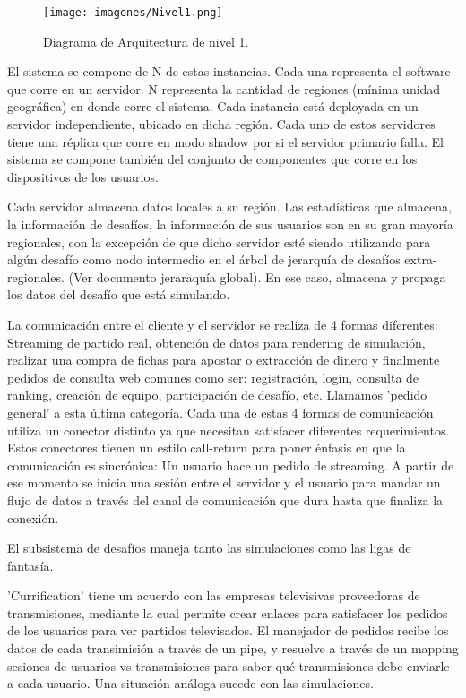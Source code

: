 \begin{figure}[H]
  \centering
  \texttt{[image: imagenes/Nivel1.png]}
  \caption{Diagrama de Arquitectura de nivel 1.}
\end{figure}

El sistema se compone de N de estas instancias. Cada una representa el software que corre en un servidor. N representa la cantidad de regiones (mínima unidad geográfica) en donde corre el sistema. Cada instancia está deployada en un servidor independiente, ubicado en dicha región. Cada uno de estos servidores tiene una réplica que corre en modo shadow por si el servidor primario falla.
El sistema se compone también del conjunto de componentes que corre en los dispositivos de los usuarios.

Cada servidor almacena datos locales a su región. Las estadísticas que almacena, la información de desafíos, la información de sus usuarios son en su gran mayoría regionales, con la excepción
de que dicho servidor esté siendo utilizando para algún desafío como nodo intermedio en el árbol de jerarquía de desafíos extra-regionales. (Ver documento jeraraquía global). En ese caso,
almacena y propaga los datos del desafío que está simulando.

La comunicación entre el cliente y el servidor se realiza de 4 formas diferentes: Streaming de partido real, obtención de datos para rendering de simulación, realizar una compra de fichas
para apostar o extracción de dinero y finalmente pedidos de consulta web comunes como ser: registración, login, consulta de ranking, creación de equipo, participación de desafío, etc. Llamamos
'pedido general' a esta última categoría. Cada una de estas 4 formas de comunicación utiliza un conector distinto ya que necesitan satisfacer diferentes requerimientos.
Estos conectores tienen un estilo call-return para poner énfasis en que la comunicación es sincrónica: Un usuario hace un pedido de streaming. A partir de ese momento se inicia una
sesión entre el servidor y el usuario para mandar un flujo de datos a través del canal de comunicación que dura hasta que finaliza la conexión.

El subsistema de desafíos maneja tanto las simulaciones como las ligas de fantasía.

'Currification' tiene un acuerdo con las empresas televisivas proveedoras de transmisiones, mediante la cual permite crear enlaces para satisfacer los pedidos de los usuarios para ver
partidos televisados. El manejador de pedidos recibe los datos de cada transimisión a través de un pipe, y resuelve a través de un mapping sesiones de usuarios vs transmisiones para
saber qué transmisiones debe enviarle a cada usuario. Una situación análoga sucede con las simulaciones.

